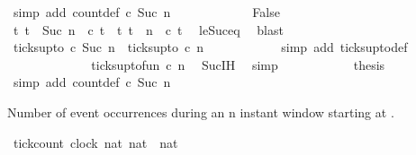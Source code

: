 \begin{isabellebody}
\ {\isacharparenleft}simp\ add{\isacharcolon}\ count{\isacharunderscore}def\ {\isacartoucheopen}c\ {\isacharparenleft}Suc\ n{\isacharparenright}{\isacartoucheclose}{\isacharparenright}\isanewline
\ \ \ \ \isamarkupfalse%
\isanewline
\ \ \ \ \ \ \isamarkupfalse%
\ False\isanewline
\ \ \ \ \ \ \ \ \isamarkupfalse%
\ {\isacartoucheopen}{\isacharbraceleft}t{\isachardot}\ t\ {\isasymle}\ Suc\ n\ {\isasymand}\ c\ t{\isacharbraceright}\ {\isacharequal}\ {\isacharbraceleft}t{\isachardot}\ t\ {\isasymle}\ n\ {\isasymand}\ c\ t{\isacharbraceright}{\isacartoucheclose}\ \isamarkupfalse%
\ le{\isacharunderscore}Suc{\isacharunderscore}eq\ \isamarkupfalse%
\ blast\isanewline
\ \ \ \ \ \ \ \ \isamarkupfalse%
\ {\isacartoucheopen}ticks{\isacharunderscore}up{\isacharunderscore}to\ c\ {\isacharparenleft}Suc\ n{\isacharparenright}\ {\isacharequal}\ ticks{\isacharunderscore}up{\isacharunderscore}to\ c\ n{\isacartoucheclose}\isanewline
\ \ \ \ \ \ \ \ \ \ \isamarkupfalse%
\ {\isacharparenleft}simp\ add{\isacharcolon}\ ticks{\isacharunderscore}up{\isacharunderscore}to{\isacharunderscore}def{\isacharparenright}\isanewline
\ \ \ \ \ \ \ \ \isamarkupfalse%
\ \isamarkupfalse%
\ {\isacartoucheopen}{\isachardot}{\isachardot}{\isachardot}\ {\isacharequal}\ ticks{\isacharunderscore}up{\isacharunderscore}to{\isacharunderscore}fun\ c\ n{\isacartoucheclose}\ \isamarkupfalse%
\ Suc{\isachardot}IH\ \isamarkupfalse%
\ simp\isanewline
\ \ \ \ \ \ \ \ \isamarkupfalse%
\ \isamarkupfalse%
\ {\isacharquery}thesis\ \isamarkupfalse%
\ {\isacharparenleft}simp\ add{\isacharcolon}\ count{\isacharunderscore}def\ {\isacartoucheopen}{\isasymnot}c\ {\isacharparenleft}Suc\ n{\isacharparenright}{\isacartoucheclose}{\isacharparenright}\isanewline
\ \ \ \ \isamarkupfalse%
\isanewline
{}\isamarkupfalse%
%
\endisatagproof
{\isafoldproof}%
%
\isadelimproof
%
\endisadelimproof
%
\begin{isamarkuptext}%
Number of event occurrences during an n instant window starting at .%
\end{isamarkuptext}\isamarkuptrue%
\isamarkupfalse%
\ tick{\isacharunderscore}count\ {\isacharcolon}{\isacharcolon}{\isacartoucheopen}{\isacharbrackleft}clock{\isacharcomma}\ nat{\isacharcomma}\ nat{\isacharbrackright}\ {\isasymRightarrow}\ nat{\isacartoucheclose}\isanewline

\end{isabellebody}
